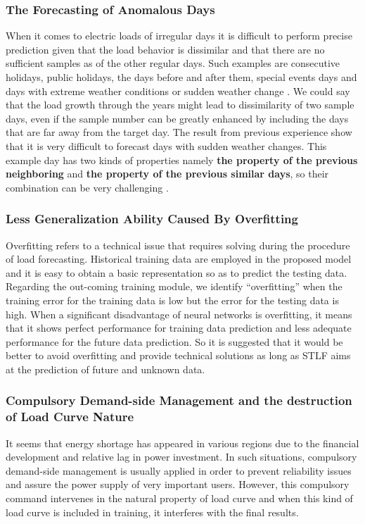 \subsubsection{The Forecasting of Anomalous Days}
When it comes to electric loads of irregular days it is difficult to perform precise prediction given that the load behavior is dissimilar and that there are no sufficient samples as of the other regular days. Such examples are consecutive holidays, public holidays, the days before and after them, special events days and days with extreme weather conditions or sudden weather change \cite{feinberg2005load}. We could say that the load growth through the years might lead to dissimilarity of two sample days, even if the sample number can be greatly enhanced by including the days that are far away from the target day. The result from previous experience show that it is very difficult to forecast days with sudden weather changes. This example day has two kinds of properties namely  \textbf{the property of the previous neighboring } and  \textbf{the property of the previous similar days}, so their combination can be very challenging \cite{cao2012data}.  

\subsubsection{Less Generalization Ability Caused By Overfitting}
Overfitting refers to a technical issue that requires solving during the procedure of load forecasting. Historical training data are employed in the proposed model and it is easy to obtain a basic representation so as to predict the testing data. Regarding the out-coming training module, we identify “overfitting” when the training error for the training data is low but the error for the testing data is high. When a significant disadvantage of neural networks is overfitting, it means that it shows perfect performance for training data prediction and less adequate performance for the future data prediction. So it is suggested that it would be better to avoid overfitting and provide technical solutions as long as STLF aims at the prediction of future and unknown data. 
\subsubsection{Compulsory Demand-side Management and the destruction of Load Curve Nature}
It seems that energy shortage has appeared in various regions due to the financial development and relative lag in power investment. In such situations, compulsory demand-side management is usually applied in order to prevent reliability issues and assure the power supply of very important users. However, this compulsory command intervenes in the natural property of load curve and when this kind of load curve is included in training, it interferes with the final results.



